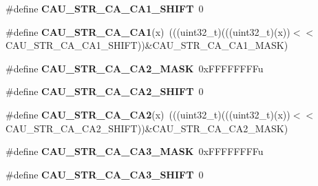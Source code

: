 \begin{DoxyCompactItemize}
\item 
\#define {\bfseries C\+A\+U\+\_\+\+S\+T\+R\+\_\+\+C\+A\+\_\+\+C\+A1\+\_\+\+S\+H\+I\+FT}~0\hypertarget{group__CAU__Register__Masks_gaf733a0f562c8ff07f24843f2971c85ed}{}\label{group__CAU__Register__Masks_gaf733a0f562c8ff07f24843f2971c85ed}

\item 
\#define {\bfseries C\+A\+U\+\_\+\+S\+T\+R\+\_\+\+C\+A\+\_\+\+C\+A1}(x)~(((uint32\+\_\+t)(((uint32\+\_\+t)(x))$<$$<$C\+A\+U\+\_\+\+S\+T\+R\+\_\+\+C\+A\+\_\+\+C\+A1\+\_\+\+S\+H\+I\+FT))\&C\+A\+U\+\_\+\+S\+T\+R\+\_\+\+C\+A\+\_\+\+C\+A1\+\_\+\+M\+A\+SK)\hypertarget{group__CAU__Register__Masks_gac941842d240ab2902d1589d14f016339}{}\label{group__CAU__Register__Masks_gac941842d240ab2902d1589d14f016339}

\item 
\#define {\bfseries C\+A\+U\+\_\+\+S\+T\+R\+\_\+\+C\+A\+\_\+\+C\+A2\+\_\+\+M\+A\+SK}~0x\+F\+F\+F\+F\+F\+F\+F\+Fu\hypertarget{group__CAU__Register__Masks_ga7a41f2c437556c9a48ed99cd8607a9f9}{}\label{group__CAU__Register__Masks_ga7a41f2c437556c9a48ed99cd8607a9f9}

\item 
\#define {\bfseries C\+A\+U\+\_\+\+S\+T\+R\+\_\+\+C\+A\+\_\+\+C\+A2\+\_\+\+S\+H\+I\+FT}~0\hypertarget{group__CAU__Register__Masks_gad603664f3d10bcbd341a2d244c0822f5}{}\label{group__CAU__Register__Masks_gad603664f3d10bcbd341a2d244c0822f5}

\item 
\#define {\bfseries C\+A\+U\+\_\+\+S\+T\+R\+\_\+\+C\+A\+\_\+\+C\+A2}(x)~(((uint32\+\_\+t)(((uint32\+\_\+t)(x))$<$$<$C\+A\+U\+\_\+\+S\+T\+R\+\_\+\+C\+A\+\_\+\+C\+A2\+\_\+\+S\+H\+I\+FT))\&C\+A\+U\+\_\+\+S\+T\+R\+\_\+\+C\+A\+\_\+\+C\+A2\+\_\+\+M\+A\+SK)\hypertarget{group__CAU__Register__Masks_ga29ee0e2f04ffcc28051a093305a77a16}{}\label{group__CAU__Register__Masks_ga29ee0e2f04ffcc28051a093305a77a16}

\item 
\#define {\bfseries C\+A\+U\+\_\+\+S\+T\+R\+\_\+\+C\+A\+\_\+\+C\+A3\+\_\+\+M\+A\+SK}~0x\+F\+F\+F\+F\+F\+F\+F\+Fu\hypertarget{group__CAU__Register__Masks_ga52281a79b1f2f28a74652e8934c3e8e7}{}\label{group__CAU__Register__Masks_ga52281a79b1f2f28a74652e8934c3e8e7}

\item 
\#define {\bfseries C\+A\+U\+\_\+\+S\+T\+R\+\_\+\+C\+A\+\_\+\+C\+A3\+\_\+\+S\+H\+I\+FT}~0\hypertarget{group__CAU__Register__Masks_gac71abdf9ef9823b10c9d3e57bcc3e197}{}\label{group__CAU__Register__Masks_gac71abdf9ef9823b10c9d3e57bcc3e197}


\end{DoxyCompactItemize}
